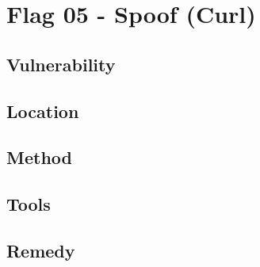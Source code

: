 \section{Flag 05 - Spoof (Curl)}

\begin{center}
\end{center}

\subsection{Vulnerability}

\subsection{Location}

\subsection{Method}

\subsection{Tools}

\subsection{Remedy}
